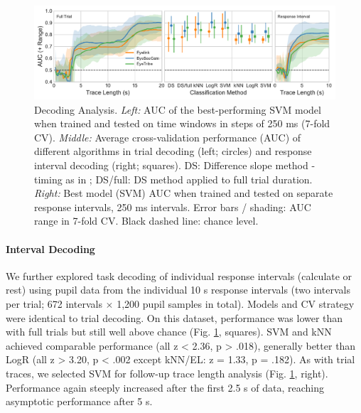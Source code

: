 \documentclass[manuscript]{acmart}
\begin{document}
\begin{figure}
    \centering
    \includegraphics[width=1\textwidth]{figure2.pdf}
    \caption{Decoding Analysis. \textit{Left:} AUC of the best-performing SVM model when trained and tested on time windows in steps of 250 ms (7-fold CV). \textit{Middle:} Average cross-validation performance (AUC) of different algorithms in trial decoding (left; circles) and response interval decoding (right; squares). DS: Difference slope method - timing as in \cite{Stoll2013}; DS/full: DS method applied to full trial duration. \textit{Right:} Best model (SVM) AUC when trained and tested on separate response intervals, 250 ms intervals. Error bars / shading: AUC range in 7-fold CV. Black dashed line: chance level.}
    \label{fig:class}
\end{figure}

\paragraph{Interval Decoding} We further explored task decoding of individual response intervals (calculate or rest) using pupil data from the individual 10 s response intervals (two intervals per trial; 672 intervals $\times$ 1,200 pupil samples in total). Models and CV strategy were identical to trial decoding. On this dataset, performance was lower than with full trials but still well above chance (Fig. \ref{fig:class}, squares). SVM and kNN achieved comparable performance (all z < 2.36, p > .018), generally better than LogR (all z > 3.20, p < .002 except kNN/EL: z = 1.33, p = .182). As with trial traces, we selected SVM for follow-up trace length analysis (Fig. \ref{fig:class}, right). Performance again steeply increased after the first 2.5 s of data, reaching asymptotic performance after 5 s.  
\end{document}
